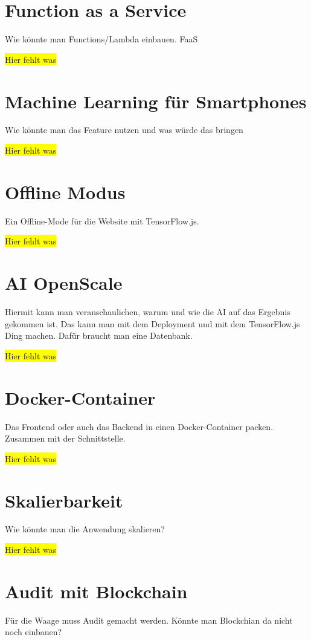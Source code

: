 \section{Function as a Service}
Wie könnte man Functions/Lambda einbauen. FaaS

\colorbox{yellow}{Hier fehlt was}

\section{Machine Learning für Smartphones}
Wie könnte man das Feature nutzen und was würde das bringen

\colorbox{yellow}{Hier fehlt was}

\section{Offline Modus}
Ein Offline-Mode für die Website mit TensorFlow.js.

\colorbox{yellow}{Hier fehlt was}

\section{AI OpenScale}
\label{ai_openscale}
Hiermit kann man veranschaulichen, warum und wie die AI auf das Ergebnis gekommen ist. Das kann man mit dem Deployment
und mit dem TensorFlow.js Ding machen. Dafür braucht man eine Datenbank.

\colorbox{yellow}{Hier fehlt was}

\section{Docker-Container}
Das Frontend oder auch das Backend in einen Docker-Container packen. Zusammen mit der Schnittstelle.

\colorbox{yellow}{Hier fehlt was}

\section{Skalierbarkeit}
Wie könnte man die Anwendung skalieren?

\colorbox{yellow}{Hier fehlt was}

\section{Audit mit Blockchain}
Für die Waage muss Audit gemacht werden. Könnte man Blockchian da nicht noch einbauen?


